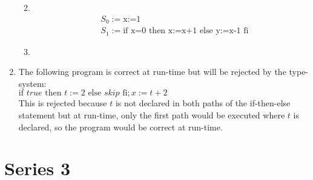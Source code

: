 \documentclass[12pt,fleqn]{article}		%
\begin{document}
\begin{enumerate}
\begin{enumerate}
\begin{prooftree}
\end{prooftree}
\item \ \\
\begin{align*}
& S_0 := \text{x:=1}\\
& S_1 := \text{if x=0 then x:=x+1 else y:=x-1 fi}
\end{align*}
\begin{prooftree}
\end{prooftree}
\item \ \\
\begin{prooftree}
\end{prooftree}
\end{enumerate}
\item The following program is correct at run-time but will be rejected by the type-system:\\
$ \text{if } true \text{ then } t:=2 \text{ else } skip \text{ fi}; x:=t+2$\\
This is rejected because $ t $ is not declared in both paths of the if-then-else statement but at run-time, only the first path would be executed where $ t $ is declared, so the program would be correct at run-time.
\end{enumerate}

\section{Series 3}
\end{document}
